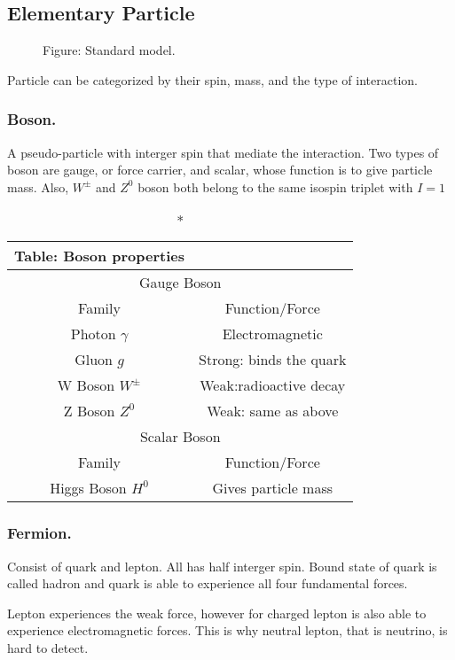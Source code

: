 \documentclass[../../../main.tex]{subfiles}
\begin{document}
\subsection{Elementary Particle}
\begin{figure*}[b]
    \centering
    \caption*{Figure: Standard model.}
\end{figure*}
Particle can be categorized by their spin, mass, and the type of interaction.

\subsubsection{Boson.} A pseudo-particle with interger spin that mediate the interaction. Two types of boson are gauge, or force carrier, and scalar, whose function is to give particle mass. Also, $W^{\pm}$ and $Z^0$ boson both belong to the same isospin triplet with $I=1$
\begin{longtable}{cc}
    \caption*{Table: Boson properties}\\
    \toprule
    \multicolumn{2}{c}{Gauge Boson}\\
    \midrule
    Family&Function/Force\\
    \midrule
    Photon $\gamma$&Electromagnetic\\
    Gluon $g$&Strong: binds the quark\\
    W Boson $W^{\pm}$&Weak:radioactive decay\\
    Z Boson $Z^0$&Weak: same as above\\
    \bottomrule
    \toprule
    \multicolumn{2}{c}{Scalar Boson}\\
    \midrule
    Family&Function/Force\\
    \midrule
    Higgs Boson $H^0$&Gives particle mass\\
    \bottomrule
\end{longtable}

\subsubsection{Fermion.} Consist of quark and lepton. All has half interger spin. Bound state of quark is called hadron and quark is able to experience all four fundamental forces.

Lepton experiences the weak force, however for charged lepton is also able to experience electromagnetic forces. This is why neutral lepton, that is neutrino, is hard to detect.
\end{document}
